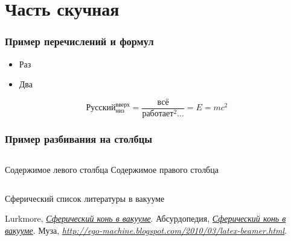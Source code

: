 \documentclass[ignorenonframetext,hyperref={pdftex,unicode}]{beamer}
\begin{document}
\section{Часть скучная}
\begin{frame}\frametitle{Пример перечислений и формул} 
	\begin{itemize}
		\item Раз
		\item Два
	\end{itemize}
	\begin{equation}
    	Русский_{низ}^{вверх} = \frac{всё}{работает^2\dots} = E = m c^2
	\end{equation}
\end{frame}

\begin{frame}\frametitle{Пример разбивания на столбцы}
 	\begin{columns}
 			Содержимое левого столбца
 			Содержимое правого столбца
 	\end{columns}
\end{frame}


\begin{frame}{Сферический список литературы в вакууме}
	\begin{thebibliography}{10}
	\beamertemplatebookbibitems
		{\sc Lurkmore}, {\em \href{http://lurkmore.to/\%D0\%A1\%D1\%84\%D0\%B5\%D1\%80\%D0\%B8\%D1\%87\%D0\%B5\%D1\%81\%D0\%BA\%D0\%B8\%D0\%B9_\%D0\%BA\%D0\%BE\%D0\%BD\%D1\%8C_\%D0\%B2_\%D0\%B2\%D0\%B0\%D0\%BA\%D1\%83\%D1\%83\%D0\%BC\%D0\%B5}{Сферический конь в вакууме}}.
		{\sc Абсурдопедия}, {\em \href{http://absurdopedia.wikia.com/wiki/\%D0\%A1\%D1\%84\%D0\%B5\%D1\%80\%D0\%B8\%D1\%87\%D0\%B5\%D1\%81\%D0\%BA\%D0\%B8\%D0\%B9_\%D0\%BA\%D0\%BE\%D0\%BD\%D1\%8C_\%D0\%B2_\%D0\%B2\%D0\%B0\%D0\%BA\%D1\%83\%D1\%83\%D0\%BC\%D0\%B5}{Сферический конь в вакууме}}.
		{\sc Муза}, {\em \url{http://ego-machine.blogspot.com/2010/03/latex-beamer.html}}.
	\end{thebibliography}
\end{frame}
\end{document}
